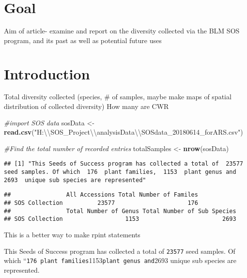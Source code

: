 \documentclass[]{article}
\newenvironment{Shaded}{\begin{snugshade}}{\end{snugshade}}
\newcommand{\KeywordTok}[1]{\textcolor[rgb]{0.13,0.29,0.53}{\textbf{{#1}}}}
\newcommand{\CharTok}[1]{\textcolor[rgb]{0.31,0.60,0.02}{{#1}}}
\newcommand{\StringTok}[1]{\textcolor[rgb]{0.31,0.60,0.02}{{#1}}}
\newcommand{\CommentTok}[1]{\textcolor[rgb]{0.56,0.35,0.01}{\textit{{#1}}}}
\newcommand{\NormalTok}[1]{{#1}}
\begin{document}
\section{Goal}\label{goal}

Aim of article- examine and report on the diversity collected via the
BLM SOS program, and its past as well as potential future uses

\section{Introduction}\label{introduction}

Total diversity collected (species, \# of samples, maybe make maps of
spatial distribution of collected diversity) How many are CWR

\begin{Shaded}
\begin{Highlighting}[]
\CommentTok{#import SOS data }
\NormalTok{sosData <-}\StringTok{ }\KeywordTok{read.csv}\NormalTok{(}\StringTok{"H:}\CharTok{\textbackslash{}\textbackslash{}}\StringTok{SOS_Project}\CharTok{\textbackslash{}\textbackslash{}}\StringTok{analysisData}\CharTok{\textbackslash{}\textbackslash{}}\StringTok{SOSdata_20180614_forARS.csv"}\NormalTok{)}

\CommentTok{#Find the total number of recorded entries }
\NormalTok{totalSamples <-}\StringTok{ }\KeywordTok{nrow}\NormalTok{(sosData)}
\end{Highlighting}
\end{Shaded}

\begin{verbatim}
## [1] "This Seeds of Success program has collected a total of  23577  seed samples. Of which  176  plant families,  1153  plant genus and  2693  unique sub species are represented"
\end{verbatim}

\begin{verbatim}
##                All Accessions Total Number of Familes
## SOS Collection          23577                     176
##                Total Number of Genus Total Number of Sub Species
## SOS Collection                  1153                        2693
\end{verbatim}

This is a better way to make rpint statements

This Seeds of Success program has collected a total of \texttt{23577}
seed samples. Of which
``\texttt{176\ plant\ families}1153\texttt{plant\ genus\ and}2693 unique
sub species are represented.
\end{document}
